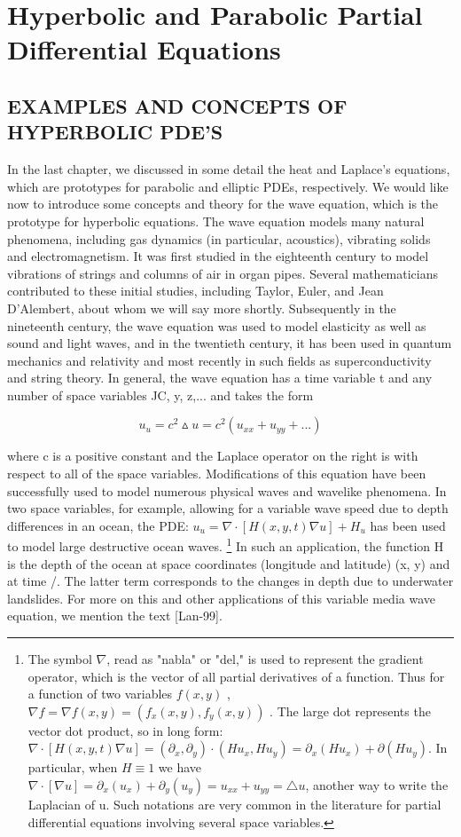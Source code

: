 \documentclass[../main.tex]{subfiles}
\begin{document}
\chapter{Hyperbolic and Parabolic Partial
Differential Equations}

\section{EXAMPLES AND CONCEPTS OF HYPERBOLIC PDE'S}

In the last chapter, we discussed in some detail the heat and Laplace's equations,
which are prototypes for parabolic and elliptic PDEs, respectively. We would like
now to introduce some concepts and theory for the wave equation, which is the
prototype for hyperbolic equations. The wave equation models many natural
phenomena, including gas dynamics (in particular, acoustics), vibrating solids and
electromagnetism. It was first studied in the eighteenth century to model vibrations
of strings and columns of air in organ pipes. Several mathematicians contributed
to these initial studies, including Taylor, Euler, and Jean D'Alembert, about whom
we will say more shortly. Subsequently in the nineteenth century, the wave
equation was used to model elasticity as well as sound and light waves, and in the
twentieth century, it has been used in quantum mechanics and relativity and most
recently in such fields as superconductivity and string theory. In general, the
wave equation has a time variable t and any number of space variables JC, y, z,...
and takes the form

\begin{equation}
u_u=c^2 \vartriangle u=c^2(u_{xx}+u_{yy}+...) 
\end{equation}

where c is a positive constant and the Laplace operator on the right is with respect
to all of the space variables. Modifications of this equation have been successfully
used to model numerous physical waves and wavelike phenomena. In two space
variables, for example, allowing for a variable wave speed due to depth
differences in an ocean, the PDE:
$u_u=\nabla \cdot[H(x,y,t) \nabla u] + H_u$
has been used to
model large destructive ocean waves. 
\footnote 
{ The symbol $\nabla$, read as "nabla" or "del," is used to represent the gradient operator, which is the
vector of all partial derivatives of a function. Thus for a function of two variables 
$f(x,y)$ , $\nabla f=\nabla  f(x,y)=(f_x(x,y), f_y(x,y))$
. The large dot represents the vector dot product, so in long form: 
$\nabla \cdot [H(x,y,t)\nabla u]= (\partial_x, \partial_y)\cdot (Hu_x, Hu_y)=\partial_x (Hu_x)+\partial(Hu_y)$. In particular, when  $H\equiv 1$ we have $\nabla \cdot [\nabla u]=\partial_x (u_x)+ \partial_y(u_y)=u_{xx}+u_{yy}=\triangle u $, another way to write the Laplacian of u. Such notations
are very common in the literature for partial differential equations involving several space variables.}
In such an application, the function H is the
depth of the ocean at space coordinates (longitude and latitude) (x, y) and at time /.
The latter term corresponds to the changes in depth due to underwater landslides.
For more on this and other applications of this variable media wave equation, we
mention the text [Lan-99].
\end{document}
